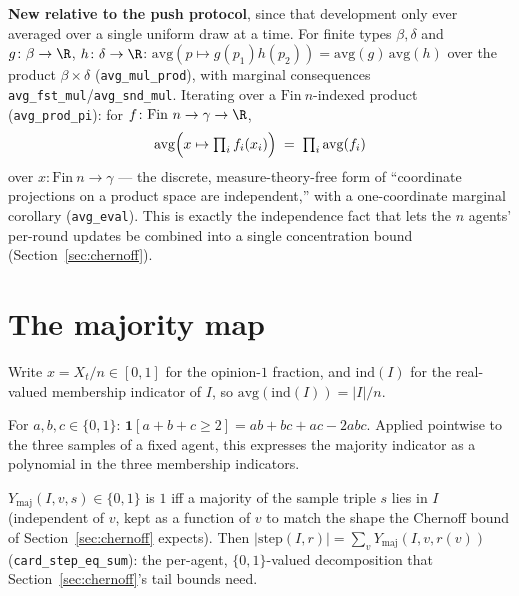 \begin{lemma}\label{lem:indep}
  \leanok
  \textbf{New relative to the push protocol}, since that development only
  ever averaged over a single uniform draw at a time. For finite types
  $\beta,\delta$ and $g \colon \beta\to\R$, $h\colon\delta\to\R$:
  $\mathrm{avg}(p \mapsto g(p_1)h(p_2)) = \mathrm{avg}(g)\,\mathrm{avg}(h)$
  over the product $\beta\times\delta$ (\texttt{avg\_mul\_prod}), with
  marginal consequences \texttt{avg\_fst\_mul}/\texttt{avg\_snd\_mul}.
  Iterating over a $\mathrm{Fin}\ n$-indexed product
  (\texttt{avg\_prod\_pi}): for $f \colon \mathrm{Fin}\ n \to \gamma \to \R$,
  \[
    \mathrm{avg}\Bigl(x \mapsto \textstyle\prod_i f_i(x_i)\Bigr)
      \;=\; \prod_i \mathrm{avg}(f_i)
  \]
  over $x \colon \mathrm{Fin}\ n \to \gamma$ --- the discrete,
  measure-theory-free form of ``coordinate projections on a product space
  are independent,'' with a one-coordinate marginal corollary
  (\texttt{avg\_eval}). This is exactly the independence fact that lets the
  $n$ agents' per-round updates be combined into a single concentration
  bound (Section~\ref{sec:chernoff}).
\end{lemma}

\section{The majority map}\label{sec:map}

Write $x = X_t/n \in [0,1]$ for the opinion-$1$ fraction, and
$\mathrm{ind}(I)$ for the real-valued membership indicator of $I$, so
$\mathrm{avg}(\mathrm{ind}(I)) = |I|/n$.

\begin{lemma}\label{lem:majpoly}
  \leanok
  For $a,b,c \in \{0,1\}$: $\mathbf 1[a+b+c\ge2] = ab+bc+ac-2abc$. Applied
  pointwise to the three samples of a fixed agent, this expresses the
  majority indicator as a polynomial in the three membership indicators.
\end{lemma}

\begin{definition}\label{def:Ymaj}
  \leanok
  $Y_{\mathrm{maj}}(I,v,s) \in \{0,1\}$ is $1$ iff a majority of the sample
  triple $s$ lies in $I$ (independent of $v$, kept as a function of $v$ to
  match the shape the Chernoff bound of Section~\ref{sec:chernoff} expects).
  Then $|\mathrm{step}(I,r)| = \sum_v Y_{\mathrm{maj}}(I,v,r(v))$
  (\texttt{card\_step\_eq\_sum}): the per-agent, $\{0,1\}$-valued
  decomposition that Section~\ref{sec:chernoff}'s tail bounds need.
\end{definition}

